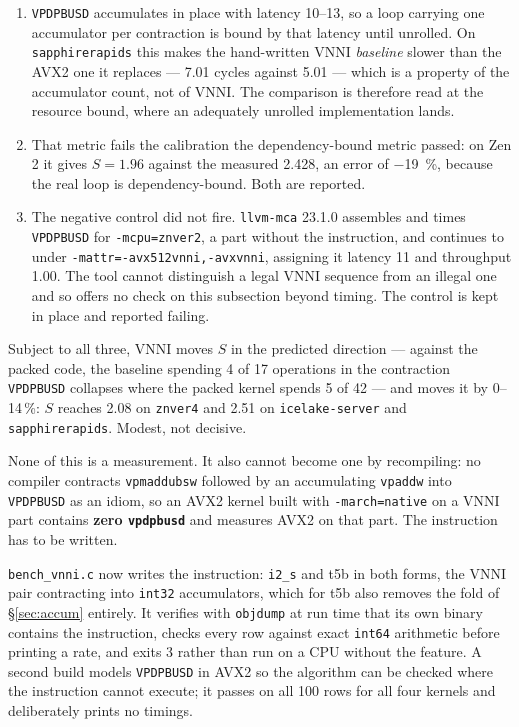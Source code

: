 \documentclass[11pt,a4paper]{article}
\newcommand{\code}[1]{\texttt{#1}}
\begin{document}
\begin{enumerate}
\item \code{VPDPBUSD} accumulates in place with latency \numrange{10}{13}, so a
loop carrying one accumulator per contraction is bound by that latency until
unrolled. On \code{sapphirerapids} this makes the hand-written VNNI
\emph{baseline} slower than the AVX2 one it replaces --- \num{7.01} cycles
against \num{5.01} --- which is a property of the accumulator count, not of
VNNI. The comparison is therefore read at the resource bound, where an
adequately unrolled implementation lands.
\item That metric fails the calibration the dependency-bound metric passed: on
Zen 2 it gives $S=\num{1.96}$ against the measured \num{2.428}, an error of
\SI{-19}{\percent}, because the real loop is dependency-bound. Both are
reported.
\item {\sloppy The negative control did not fire. \code{llvm-mca} 23.1.0 assembles and
times \code{VPDPBUSD} for \code{-mcpu=znver2}, a part without the instruction,
and continues to under \code{-mattr=-avx512vnni,\discretionary{}{}{}-avxvnni},
assigning it latency
11 and throughput \num{1.00}. The tool cannot distinguish a legal VNNI sequence
from an illegal one and so offers no check on this subsection beyond timing. The
control is kept in place and reported failing.\par}
\end{enumerate}

Subject to all three, VNNI moves $S$ in the predicted direction --- against the
packed code, the baseline spending 4 of 17 operations in the contraction
\code{VPDPBUSD} collapses where the packed kernel spends 5 of 42 --- and moves
it by \numrange{0}{14}\,\%: $S$ reaches \num{2.08} on \code{znver4} and
\num{2.51} on \code{icelake-server} and \code{sapphirerapids}. Modest, not
decisive.

None of this is a measurement. It also cannot become one by
recompiling: no compiler contracts \code{vpmaddubsw} followed by an accumulating
\code{vpaddw} into \code{VPDPBUSD} as an idiom, so an AVX2 kernel built with
\code{-march=native} on a VNNI part contains \textbf{zero \code{vpdpbusd}} and
measures AVX2 on that part. The instruction has to be written.

\code{bench\_vnni.c} now writes the instruction: \code{i2\_s} and t5b in both
forms, the VNNI pair contracting into \code{int32} accumulators, which for t5b
also removes the fold of \S\ref{sec:accum} entirely. It verifies with
\code{objdump} at run time that its own binary contains the instruction, checks
every row against exact \code{int64} arithmetic before printing a rate, and
exits 3 rather than run on a CPU without the feature. A second build models
\code{VPDPBUSD} in AVX2 so the algorithm can be checked where the instruction
cannot execute; it passes on all 100 rows for all four kernels and deliberately
prints no timings.
\end{document}

